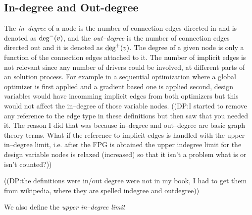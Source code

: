 \subsection{In-degree and Out-degree}
	\label{s:indegree-outdegree}
	The \emph{in--degree} of a node is the number of connection edges directed in and 
	is denoted as $\textrm{deg}^-(v)$, and the \emph{out--degree} 
	is the number of connection edges directed out and it is denoted as $\textrm{deg}^+(v)$.
	The degree of a given node is only a function of the connection edges 
	attached to it. The number of implicit edges is not relevant since any number 
	of drivers could be involved, at different parts of an solution process. For 
	example in a sequential optimization where a global optimizer is first applied
	and a gradient based one is applied second, design variables would have incomming 
	implicit edges from both optimizers but this would not affect the in--degree of those
	variable nodes. 
	((DP:I started to remove any reference to the edge type in these definitions but then saw that you needed it. The reason I did that was because in--degree and out--degree are basic graph theory terms. What if the reference to implicit edges is handled with the upper in--degree limit, i.e. after the FPG is obtained the upper indegree limit for the design variable nodes is relaxed (increased) so that it isn't a problem what is or isn't counted?))

	((DP:the definitions were in/out degree were not in my book, I had to get them from wikipedia, where they are spelled indegree and outdegree))

	We also define the \emph{upper in--degree limit} 

